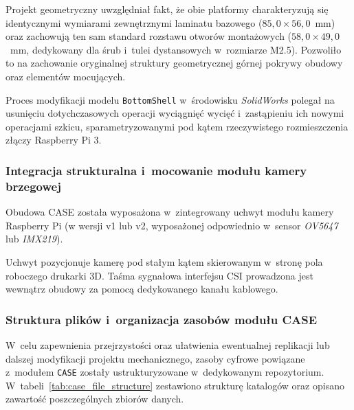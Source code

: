 \documentclass[a4paper,12pt,reqno]{article}
\begin{document}
Projekt geometryczny uwzględniał fakt, że obie platformy charakteryzują się identycznymi wymiarami zewnętrznymi laminatu bazowego ($85,0 \times 56,0$~mm) oraz zachowują ten sam standard rozstawu otworów montażowych ($58,0 \times 49,0$~mm, dedykowany dla śrub i~tulei dystansowych w~rozmiarze M2.5). Pozwoliło to na zachowanie oryginalnej struktury geometrycznej górnej pokrywy obudowy oraz elementów mocujących. 

Proces modyfikacji modelu \texttt{BottomShell} w~środowisku \textit{SolidWorks} polegał na usunięciu dotychczasowych operacji wyciągnięć wycięć i~zastąpieniu ich nowymi operacjami szkicu, sparametryzowanymi pod kątem rzeczywistego rozmieszczenia złączy Raspberry Pi 3. 


\subsubsection{Integracja strukturalna i~mocowanie modułu kamery brzegowej}


Obudowa CASE została wyposażona w~zintegrowany uchwyt modułu kamery Raspberry Pi (w wersji v1 lub v2, wyposażonej odpowiednio w~sensor \textit{OV5647} lub \textit{IMX219}).

Uchwyt pozycjonuje kamerę pod stałym kątem skierowanym w~stronę pola roboczego drukarki 3D. Taśma sygnałowa interfejsu CSI prowadzona jest wewnątrz obudowy za pomocą dedykowanego kanału kablowego.

\subsubsection{Struktura plików i~organizacja zasobów modułu CASE}

W~celu zapewnienia przejrzystości oraz ułatwienia ewentualnej replikacji lub dalszej modyfikacji projektu mechanicznego, zasoby cyfrowe powiązane z~modułem \texttt{CASE} zostały ustrukturyzowane w~dedykowanym repozytorium. W~tabeli~\ref{tab:case_file_structure} zestawiono strukturę katalogów oraz opisano zawartość poszczególnych zbiorów danych.
\end{document}
